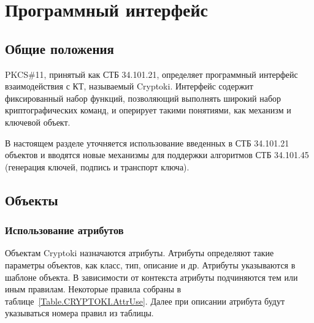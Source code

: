 \chapter{Программный интерфейс}\label{CRYPTOKI}


\section{Общие положения}

PKCS\#11, принятый как СТБ 34.101.21, определяет программный
интерфейс взаимодействия с КТ, называемый Cryptoki.
Интерфейс содержит фиксированный набор функций, позволяющий
выполнять широкий набор криптографических команд, и
оперирует такими понятиями, как механизм и ключевой объект.

В настоящем разделе уточняется использование введенных
в СТБ 34.101.21 объектов и вводятся новые механизмы для поддержки
алгоритмов СТБ 34.101.45 (генерация ключей, подпись и транспорт ключа).

\section{Объекты}

\subsection{Использование атрибутов}

Объектам Cryptoki назначаются атрибуты. Атрибуты
определяют такие параметры объектов, как класс, тип, описание и др. 
Атрибуты указываются в шаблоне объекта.
В зависимости от контекста атрибуты подчиняются тем или иным правилам.
Некоторые правила собраны в таблице~\ref{Table.CRYPTOKI.AttrUse}.
Далее при описании атрибута будут указываться номера правил из таблицы. 

